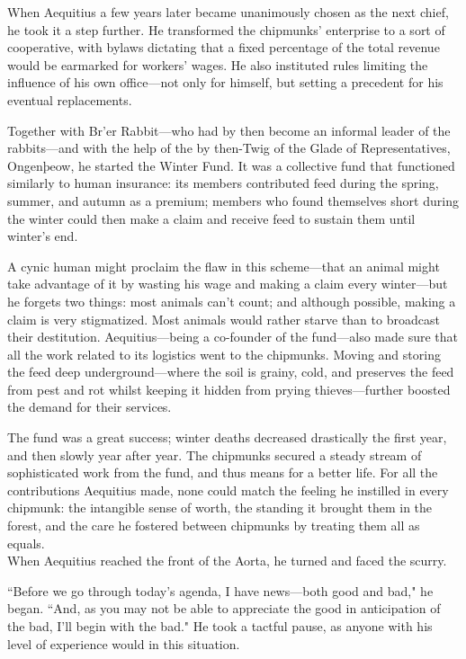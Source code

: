 When Aequitius a few years later became unanimously chosen as the next chief, he took it a step further.
He transformed the chipmunks' enterprise to a sort of cooperative, with bylaws dictating that a fixed percentage of the total revenue would be earmarked for workers' wages.
He also instituted rules limiting the influence of his own office---not only for himself, but setting a precedent for his eventual replacements.

Together with Br'er Rabbit---who had by then become an informal leader of the rabbits---and with the help of the by then-Twig of the Glade of Representatives, Ongenþeow, he started the Winter Fund.
It was a collective fund that functioned similarly to human insurance: its members contributed feed during the spring, summer, and autumn as a premium; members who found themselves short during the winter could then make a claim and receive feed to sustain them until winter's end.

A cynic human might proclaim the flaw in this scheme---that an animal might take advantage of it by wasting his wage and making a claim every winter---but he forgets two things: most animals can't count; and although possible, making a claim is very stigmatized.
Most animals would rather starve than to broadcast their destitution.
Aequitius---being a co-founder of the fund---also made sure that all the work related to its logistics went to the chipmunks.
Moving and storing the feed deep underground---where the soil is grainy, cold, and preserves the feed from pest and rot whilst keeping it hidden from prying thieves---further boosted the demand for their services.

The fund was a great success; winter deaths decreased drastically the first year, and then slowly year after year.
The chipmunks secured a steady stream of sophisticated work from the fund, and thus means for a better life.
For all the contributions Aequitius made, none could match the feeling he instilled in every chipmunk: the intangible sense of worth, the standing it brought them in the forest, and the care he fostered between chipmunks by treating them all as equals.\\

When Aequitius reached the front of the Aorta, he turned and faced the scurry.

``Before we go through today's agenda, I have news---both good and bad," he began.
``And, as you may not be able to appreciate the good in anticipation of the bad, I'll begin with the bad."
He took a tactful pause, as anyone with his level of experience would in this situation.

